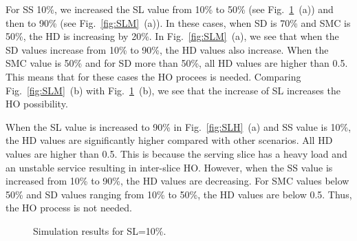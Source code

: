 \documentclass[graybox]{svmult}
\begin{document}
For SS 10\%, we increased the SL value from 10\% to 50\% (see Fig.~\ref{fig:SLL}~(a)) and then
to 90\% (see Fig.~\ref{fig:SLM}~(a)). In these cases, when SD is 70\% and SMC is 50\%, the HD is increasing by 20\%. In Fig.~\ref{fig:SLM}~(a), we see that when the SD values increase from 10\% to 90\%, the HD values also increase. When the SMC value is 50\% and for SD more than 50\%, all  HD values are higher than 0.5. This means that for these cases the HO procees is needed. Comparing Fig.~\ref{fig:SLM}~(b) with Fig.~\ref{fig:SLL}~(b), we see that the increase of SL increases the HO possibility. 
  
When the SL value is increased to 90\% in Fig.~\ref{fig:SLH}~(a) and SS value is 10\%, the HD values are significantly higher compared with other scenarios. All HD values are higher than 0.5. This is because the serving slice has a heavy load and an unstable service resulting in inter-slice HO. However, when the SS value is increased from 10\% to 90\%, the HD values are decreasing. For SMC values below 50\% and SD values ranging from 10\% to 50\%, the HD values are below 0.5. Thus, the HO process is not needed.
   


\begin{figure}\centering
    \caption{\label{fig:SLL}Simulation results for SL=10\%.}
\end{figure}
\end{document}
